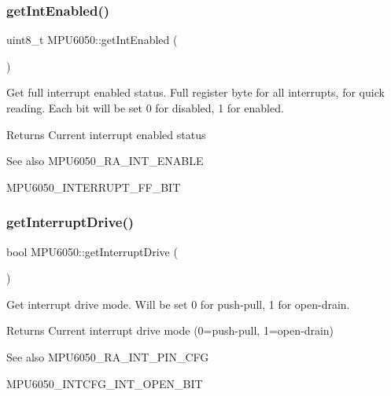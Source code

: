 \subsubsection{\texorpdfstring{getIntEnabled()}{getIntEnabled()}}
{\footnotesize\ttfamily uint8\+\_\+t M\+P\+U6050\+::get\+Int\+Enabled (\begin{DoxyParamCaption}{ }\end{DoxyParamCaption})}

Get full interrupt enabled status. Full register byte for all interrupts, for quick reading. Each bit will be set 0 for disabled, 1 for enabled. \begin{DoxyReturn}{Returns}
Current interrupt enabled status 
\end{DoxyReturn}
\begin{DoxySeeAlso}{See also}
M\+P\+U6050\+\_\+\+R\+A\+\_\+\+I\+N\+T\+\_\+\+E\+N\+A\+B\+LE 

M\+P\+U6050\+\_\+\+I\+N\+T\+E\+R\+R\+U\+P\+T\+\_\+\+F\+F\+\_\+\+B\+IT 
\end{DoxySeeAlso}
\mbox{\label{class_m_p_u6050_af66e6c7b1885dcf452e73371790fddfd}} 
\subsubsection{\texorpdfstring{getInterruptDrive()}{getInterruptDrive()}}
{\footnotesize\ttfamily bool M\+P\+U6050\+::get\+Interrupt\+Drive (\begin{DoxyParamCaption}{ }\end{DoxyParamCaption})}

Get interrupt drive mode. Will be set 0 for push-\/pull, 1 for open-\/drain. \begin{DoxyReturn}{Returns}
Current interrupt drive mode (0=push-\/pull, 1=open-\/drain) 
\end{DoxyReturn}
\begin{DoxySeeAlso}{See also}
M\+P\+U6050\+\_\+\+R\+A\+\_\+\+I\+N\+T\+\_\+\+P\+I\+N\+\_\+\+C\+FG 

M\+P\+U6050\+\_\+\+I\+N\+T\+C\+F\+G\+\_\+\+I\+N\+T\+\_\+\+O\+P\+E\+N\+\_\+\+B\+IT 
\end{DoxySeeAlso}
\mbox{\label{class_m_p_u6050_a5502c4c2a9bc4ea9267e128b7743923d}} 
